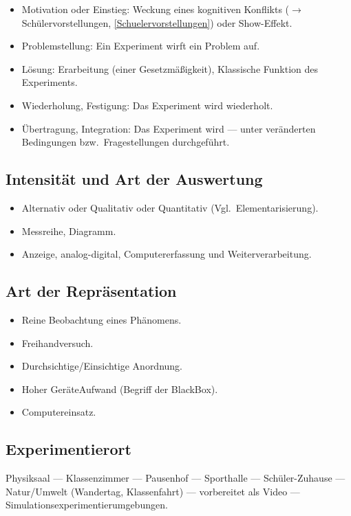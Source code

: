 \begin{itemize}
	\item
	Motivation oder Einstieg: Weckung eines kognitiven Konflikts ($\to$ Schülervorstellungen, \cref{Schuelervorstellungen})
	oder Show-Effekt.
	\item
	Problemstellung: Ein Experiment wirft ein Problem auf.
	\item
	L\"{o}sung: Erarbeitung (einer Gesetzm\"{a}{\ss}igkeit),
	Klassische Funktion des Experiments.
	
	\item
	Wiederholung, Festigung: Das Experiment wird wiederholt.
	
	\item
	\"{U}bertragung, Integration: Das Experiment wird --- unter ver\"{a}nderten
	Bedingungen bzw.\ Fragestellungen durchgef\"{u}hrt.
\end{itemize}

\subsection{Intensit\"{a}t und Art der Auswertung}
\begin{itemize}
	\item
	Alternativ oder
	Qualitativ oder Quantitativ (Vgl.\ Elementarisierung).
	\item
	Messreihe, Diagramm.
	\item
	Anzeige, analog-digital, Computererfassung und Weiterverarbeitung.
\end{itemize}

\subsection{Art der Repr\"{a}sentation}
\begin{itemize}
	\item
	Reine Beobachtung eines Ph\"{a}nomens.
	\item
	Freihandversuch.
	\item
	Durchsichtige/Einsichtige Anordnung.
	\item
	Hoher Ger\"{a}teAufwand (Begriff der BlackBox).
	\item
	Computereinsatz.
\end{itemize}

\subsection{Experimentierort}
Physiksaal --- Klassenzimmer --- Pausenhof --- Sporthalle
 --- Sch\"{u}ler-Zuhause --- Natur/Umwelt (Wandertag, Klassenfahrt) --- vorbereitet als Video --- Simulationsexperimentierumgebungen.

